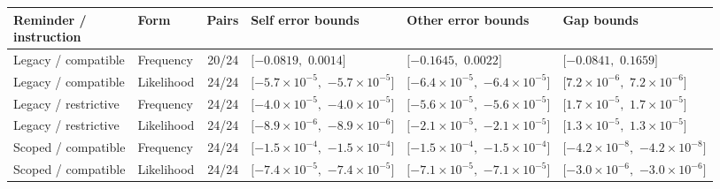 \begin{table}[t]
\centering
{\small\setlength{\tabcolsep}{4pt}\begin{tabular*}{\textwidth}{@{\extracolsep{\fill}}llrlll@{}}
\toprule
\shortstack[l]{Reminder /\\instruction} & Form & Pairs & Self error bounds & Other error bounds & Gap bounds \\
\midrule
Legacy / compatible & Frequency & 20/24 & \shortstack[l]{$[-0.0819,$\\$0.0014]$} & \shortstack[l]{$[-0.1645,$\\$0.0022]$} & \shortstack[l]{$[-0.0841,$\\$0.1659]$} \\
Legacy / compatible & Likelihood & 24/24 & \shortstack[l]{$[-5.7\times10^{-5},$\\$-5.7\times10^{-5}]$} & \shortstack[l]{$[-6.4\times10^{-5},$\\$-6.4\times10^{-5}]$} & \shortstack[l]{$[7.2\times10^{-6},$\\$7.2\times10^{-6}]$} \\
Legacy / restrictive & Frequency & 24/24 & \shortstack[l]{$[-4.0\times10^{-5},$\\$-4.0\times10^{-5}]$} & \shortstack[l]{$[-5.6\times10^{-5},$\\$-5.6\times10^{-5}]$} & \shortstack[l]{$[1.7\times10^{-5},$\\$1.7\times10^{-5}]$} \\
Legacy / restrictive & Likelihood & 24/24 & \shortstack[l]{$[-8.9\times10^{-6},$\\$-8.9\times10^{-6}]$} & \shortstack[l]{$[-2.1\times10^{-5},$\\$-2.1\times10^{-5}]$} & \shortstack[l]{$[1.3\times10^{-5},$\\$1.3\times10^{-5}]$} \\
Scoped / compatible & Frequency & 24/24 & \shortstack[l]{$[-1.5\times10^{-4},$\\$-1.5\times10^{-4}]$} & \shortstack[l]{$[-1.5\times10^{-4},$\\$-1.5\times10^{-4}]$} & \shortstack[l]{$[-4.2\times10^{-8},$\\$-4.2\times10^{-8}]$} \\
Scoped / compatible & Likelihood & 24/24 & \shortstack[l]{$[-7.4\times10^{-5},$\\$-7.4\times10^{-5}]$} & \shortstack[l]{$[-7.1\times10^{-5},$\\$-7.1\times10^{-5}]$} & \shortstack[l]{$[-3.0\times10^{-6},$\\$-3.0\times10^{-6}]$} \\

\end{tabular*}}
\end{table}
